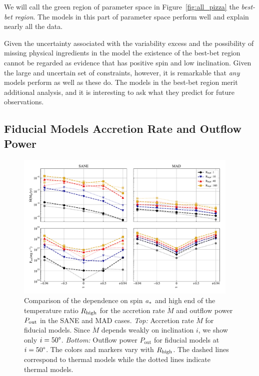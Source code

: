 We will call the green region of parameter space in Figure~\ref{fig:all_pizza} the {\em best-bet region}.
The models in this part of parameter space perform well and explain nearly all the data.

Given the uncertainty associated with the variability excess and the possibility of missing physical ingredients in the model the existence of the best-bet region cannot be regarded as evidence that \sgra has positive spin and low inclination.
Given the large and uncertain set of constraints, however, it is remarkable that {\em any} models perform as well as these do.
The models in the best-bet region merit additional analysis, and it is interesting to ask what they predict for future observations.

\subsection{Fiducial Models Accretion Rate and Outflow Power}
\label{sec:accrate_outflowpower}

\begin{figure}
  \centering
  \includegraphics[width=0.95\textwidth]{figures/bhac_kharma_average_mdot_pout.pdf}
  \caption{Comparison of the dependence on spin $a_*$ and high end of the temperature ratio $R_\mathrm{high}$ for the accretion rate $\dot{M}$ and outflow power $P_{\rm out}$ in the SANE and MAD cases.
    {\it Top:} Accretion rate $\dot{M}$ for fiducial models.
    Since $\dot{M}$ depends weakly on inclination $i$, we show only $i=50\degree$.
    {\it Bottom:} Outflow power $P_\mathrm{out}$ for fiducial models at $i = 50\degree$.
    The colors and markers vary with $R_\mathrm{high}$.
    The dashed lines correspond to \kharma thermal models while the dotted lines indicate \bhac thermal models.}
  \label{fig:accretion_outflow_power_illinois_thermal}
\end{figure}

